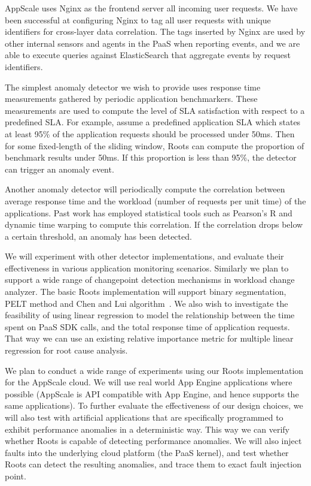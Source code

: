 AppScale uses Nginx as the frontend server all incoming user requests. We have been
successful at configuring Nginx to tag all user requests with unique identifiers for cross-layer
data correlation. The tags inserted by Nginx are used by other internal sensors and agents 
in the PaaS when reporting events, and we are able to execute queries against ElasticSearch
that aggregate events by request identifiers.
 
The simplest anomaly detector we wish to provide uses response time measurements gathered by periodic
application benchmarkers. These measurements are used to compute the level of SLA satisfaction
with respect to a predefined SLA. For example, assume a predefined application SLA which states
at least 95\% of the application requests should be processed under 50ms. Then for some fixed-length
of the sliding window, Roots can compute the proportion of benchmark results under 50ms. If this
proportion is less than 95\%, the detector can trigger an anomaly event.

Another anomaly detector will periodically compute the correlation between average response time and
the workload (number of requests per unit time) of the applications. Past work has employed
statistical tools such as Pearson's R and dynamic time warping to compute this correlation.
If the correlation drops below a certain threshold, an anomaly has been detected.

We will experiment with other detector implementations, and evaluate their effectiveness
in various application monitoring scenarios. Similarly we plan to support a wide range
of changepoint detection mechanisms in workload change analyzer. The basic Roots implementation
will support binary segmentation, PELT method and Chen and Lui algorithm~\cite{killick2012optimal, cl93}. 
We also wish
to investigate the feasibility of using linear regression to model the relationship 
between the time spent on PaaS SDK calls, and the total response time of application
requests. That way we can use an existing relative importance metric for multiple
linear regression for root cause analysis.

We plan to conduct a wide range of experiments using our Roots implementation for the
AppScale cloud. We will use real world App Engine applications where possible (AppScale
is API compatible with App Engine, and hence supports the same applications). To
further evaluate the effectiveness of our design choices, we will also test with
artificial applications that are specifically programmed to exhibit performance
anomalies in a deterministic way. This way we can verify whether Roots is
capable of detecting performance anomalies.
We will also inject faults into the underlying cloud platform (the PaaS kernel),
and test whether Roots can detect the resulting anomalies, and trace them to
exact fault injection point.

